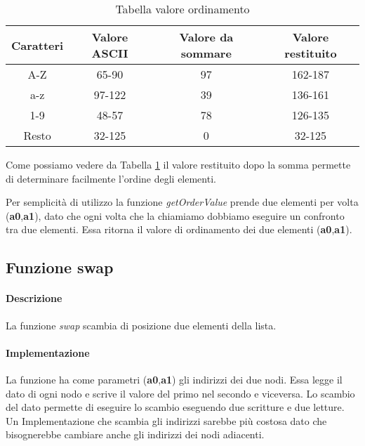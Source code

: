 \begin{table}[H]
    \begin{center}
        \begin{tabular}{|c|c|c|c|}
            \hline
            Caratteri & Valore ASCII & Valore da sommare & Valore restituito \\
            \hline
            A-Z & 65-90 & 97 & 162-187 \\
            \hline
            a-z & 97-122 & 39 & 136-161 \\
            \hline
            1-9 & 48-57 & 78 & 126-135 \\
            \hline
            Resto & 32-125 & 0 & 32-125 \\
            \hline
        \end{tabular}
    \end{center}
    \caption{Tabella valore ordinamento}
    \label{tab:orderingValue}
\end{table}


Come possiamo vedere da Tabella \ref{tab:orderingValue} il valore restituito dopo la somma permette
di determinare facilmente l'ordine degli elementi.

Per semplicità di utilizzo la funzione \textit{getOrderValue} prende due elementi per volta (\textbf{a0},\textbf{a1}),
dato che ogni volta che la chiamiamo dobbiamo eseguire un confronto tra due elementi.
Essa ritorna il valore di ordinamento dei due elementi (\textbf{a0},\textbf{a1}). 

\subsection{Funzione swap}

\paragraph{Descrizione}
 La funzione \textit{swap} scambia di posizione due elementi della lista.
\paragraph{Implementazione} 
La funzione ha come parametri (\textbf{a0},\textbf{a1}) gli indirizzi dei due nodi.
Essa legge il dato di ogni nodo e scrive il valore del primo nel secondo e viceversa.
Lo scambio del dato permette di eseguire lo scambio eseguendo due scritture e due letture.
Un Implementazione che scambia gli indirizzi sarebbe più costosa dato che bisognerebbe cambiare anche gli indirizzi dei nodi adiacenti.

